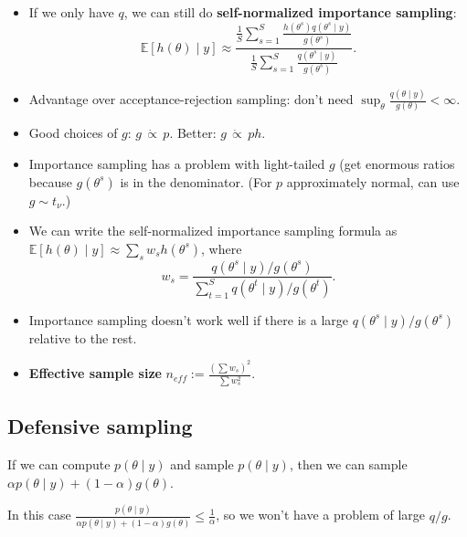 \documentclass[twoside]{article}
\newcommand{\dis}{\displaystyle}
\newcommand\bbE{\mathbb{E}}
\def\t{\theta}
\begin{document}
\begin{itemize}
\item If we only have $q$, we can still do \textbf{self-normalized importance sampling}:
\begin{equation*}
\bbE [h(\t) \mid y] \approx \frac{\dis\frac{1}{S}\sum_{s=1}^S \frac{h(\t^s)q(\t^s \mid y)}{g(\t^s)}}{\dis\frac{1}{S}\sum_{s=1}^S \frac{q(\t^s \mid y)}{g(\t^s)}}.
\end{equation*}

\item Advantage over acceptance-rejection sampling: don't need $\dis\sup_\t\frac{q(\t \mid y)}{g(\t)} < \infty$.

\item Good choices of $g$: $g \,\dot{\propto}\, p$. Better: $g \,\dot{\propto} \, ph$.

\item Importance sampling has a problem with light-tailed $g$ (get enormous ratios because $g(\t^s)$ is in the denominator. (For $p$ approximately normal, can use $g \sim t_\nu$.)

\item We can write the self-normalized importance sampling formula as $\bbE [h(\t) \mid y] \approx \dis\sum_s w_s h(\t^s)$, where
\begin{equation*}
w_s = \frac{q(\t^s \mid y)/g(\t^s)}{\sum_{t=1}^S q(\t^t \mid y)/g(\t^t)}.
\end{equation*}

\item Importance sampling doesn't work well if there is a large $q(\t^s \mid y)/g(\t^s)$ relative to the rest.

\item \textbf{Effective sample size} $n_{eff} := \dis\frac{(\sum w_s)^2}{\sum w_s^2}$.

\end{itemize}

\subsection*{Defensive sampling}
If we can compute $p(\t \mid y)$ and sample $p(\t \mid y)$, then we can sample $\alpha p(\t \mid y) + (1-\alpha) g(\t)$.

In this case $\dis\frac{p(\t \mid y)}{\alpha p(\t \mid y) + (1-\alpha) g(\t)} \leq \frac{1}{\alpha}$, so we won't have a problem of large $q/g$.
\end{document}
